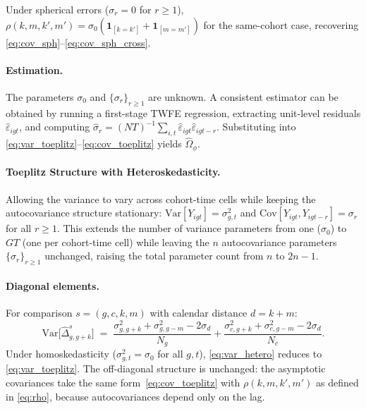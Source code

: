 \documentclass[12pt,letterpaper]{article}
\theoremstyle{remark}
\theoremstyle{definition}
\begin{document}
Under spherical errors ($\sigma_r=0$ for $r\geq1$), $\rho(k,m,k',m')=
\sigma_0(\mathbf{1}_{[k=k']}+\mathbf{1}_{[m=m']})$ for the same-cohort case,
recovering \eqref{eq:cov_sph}--\eqref{eq:cov_sph_cross}.

\paragraph{Estimation.}
The parameters $\sigma_0$ and $\{\sigma_r\}_{r\geq1}$ are unknown. A
consistent estimator can be obtained by running a first-stage TWFE regression,
extracting unit-level residuals $\hat{\varepsilon}_{igt}$, and computing
$\hat\sigma_r=(NT)^{-1}\sum_{i,t}\hat\varepsilon_{igt}\hat\varepsilon_{igt-r}$.
Substituting into \eqref{eq:var_toeplitz}--\eqref{eq:cov_toeplitz} yields
$\hat\Omega_\phi$.

\paragraph{Toeplitz Structure with Heteroskedasticity.}
\label{sec:gmm_toeplitz_hetero}

Allowing the variance to vary across cohort-time cells while keeping the
autocovariance structure stationary:
$\mathrm{Var}[Y_{igt}]=\sigma_{g,t}^{2}$ and
$\mathrm{Cov}[Y_{igt},Y_{igt-r}]=\sigma_r$ for all $r\geq1$. This extends
the number of variance parameters from one ($\sigma_0$) to $GT$ (one per
cohort-time cell) while leaving the $n$ autocovariance parameters
$\{\sigma_r\}_{r\geq1}$ unchanged, raising the total parameter count from
$n$ to $2n-1$.

\paragraph{Diagonal elements.}
For comparison $s=(g,c,k,m)$ with calendar distance $d=k+m$:
\begin{equation}
  \mathrm{Var}\!\bigl[\hat\Delta^{s}_{g,g+k}\bigr]
  \;=\;
  \frac{\sigma^{2}_{g,g+k}+\sigma^{2}_{g,g-m}-2\sigma_d}{N_g}
  +
  \frac{\sigma^{2}_{c,g+k}+\sigma^{2}_{c,g-m}-2\sigma_d}{N_c}.
  \label{eq:var_hetero}
\end{equation}
Under homoskedasticity ($\sigma^2_{g,t}=\sigma_0$ for all $g,t$),
\eqref{eq:var_hetero} reduces to \eqref{eq:var_toeplitz}. The off-diagonal
structure is unchanged: the asymptotic covariances take the same
form~\eqref{eq:cov_toeplitz} with $\rho(k,m,k',m')$ as defined in
\eqref{eq:rho}, because autocovariances depend only on the lag.
\end{document}

